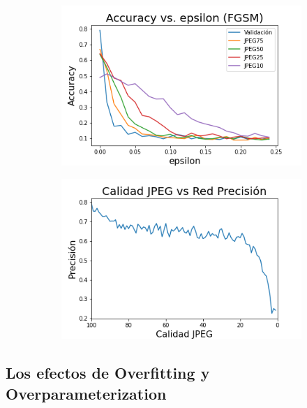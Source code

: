 \begin{figure}[h]
    \centering
    \begin{subfigure}[b]{0.49\textwidth}
        \centering
        \includegraphics[width=\textwidth]{images/cifar-10/cifar_epsilon_accuracy.png}
        \caption{}
        \label{cifar_jpeg_accuracy}
    \end{subfigure}
    \begin{subfigure}[b]{0.49\textwidth}
        \centering
        \includegraphics[width=\textwidth]{images/cifar-10/cifar_JPEG_accuracy.png}
        \caption{}
        \label{cifar_accuracy_epsilon}
    \end{subfigure}
    \caption{ }
    \label{cifrar_accuracy}
\end{figure}



\pagebreak

\subsection{Los efectos de Overfitting y Overparameterization}

